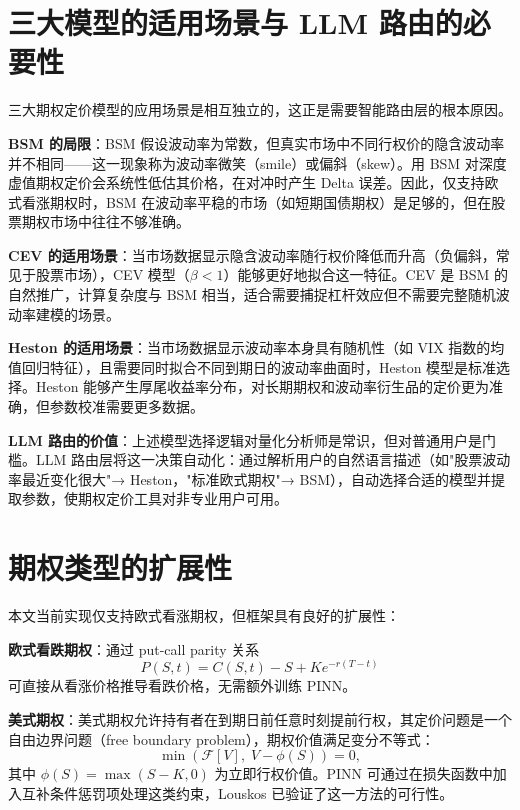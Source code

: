 \section{三大模型的适用场景与 LLM 路由的必要性}\label{sec:motivation}

三大期权定价模型的应用场景是相互独立的，这正是需要智能路由层的根本原因。

\textbf{BSM 的局限}：BSM 假设波动率为常数，但真实市场中不同行权价的隐含波动率并不相同——这一现象称为波动率微笑（smile）或偏斜（skew）。用 BSM 对深度虚值期权定价会系统性低估其价格，在对冲时产生 Delta 误差。因此，仅支持欧式看涨期权时，BSM 在波动率平稳的市场（如短期国债期权）是足够的，但在股票期权市场中往往不够准确。

\textbf{CEV 的适用场景}：当市场数据显示隐含波动率随行权价降低而升高（负偏斜，常见于股票市场），CEV 模型（$\beta < 1$）能够更好地拟合这一特征。CEV 是 BSM 的自然推广，计算复杂度与 BSM 相当，适合需要捕捉杠杆效应但不需要完整随机波动率建模的场景。

\textbf{Heston 的适用场景}：当市场数据显示波动率本身具有随机性（如 VIX 指数的均值回归特征），且需要同时拟合不同到期日的波动率曲面时，Heston 模型是标准选择。Heston 能够产生厚尾收益率分布，对长期期权和波动率衍生品的定价更为准确，但参数校准需要更多数据。

\textbf{LLM 路由的价值}：上述模型选择逻辑对量化分析师是常识，但对普通用户是门槛。LLM 路由层将这一决策自动化：通过解析用户的自然语言描述（如"股票波动率最近变化很大"→ Heston，"标准欧式期权"→ BSM），自动选择合适的模型并提取参数，使期权定价工具对非专业用户可用。

\section{期权类型的扩展性}\label{sec:option_types}

本文当前实现仅支持欧式看涨期权，但框架具有良好的扩展性：

\textbf{欧式看跌期权}：通过 put-call parity 关系
\begin{equation}
  P(S, t) = C(S, t) - S + Ke^{-r(T-t)}
\end{equation}
可直接从看涨价格推导看跌价格，无需额外训练 PINN。

\textbf{美式期权}：美式期权允许持有者在到期日前任意时刻提前行权，其定价问题是一个自由边界问题（free boundary problem），期权价值满足变分不等式：
\begin{equation}
  \min\left(\mathcal{F}[V],\; V - \phi(S)\right) = 0,
\end{equation}
其中 $\phi(S) = \max(S-K, 0)$ 为立即行权价值。PINN 可通过在损失函数中加入互补条件惩罚项处理这类约束，Louskos\citep{louskos2021american} 已验证了这一方法的可行性。

